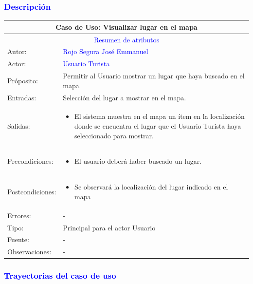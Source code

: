 \subsubsection{\textcolor{blue}{Descripción}}
\begin{tabularx}{16cm}{||l|X||}
	\hline
	\multicolumn{2}{||c||}{Caso de Uso: Visualizar lugar en el mapa } \\
	\hline
	\multicolumn{2}{||c||}{\textcolor{blue}{Resumen de atributos}} \\
         \hline
	{Autor:} & {\textcolor{blue}{Rojo Segura José Emmanuel}} \\
	\hline
	\hline
	{Actor:} & {\textcolor{blue}{Usuario Turista}} \\
	\hline
	{Próposito:} & {Permitir al Usuario mostrar un lugar que haya buscado en el mapa} \\
	\hline
	{Entradas:} &  Selección del lugar a mostrar en el mapa.\\
	\hline
	{Salidas:} & 
        \begin{itemize}
        \item El sistema muestra en el mapa un ítem en la localización donde se encuentra el lugar que el Usuario Turista haya seleccionado para mostrar.
        \end{itemize} \\
	\hline
	{Precondiciones:} & 
 \begin{itemize}
     \item El usuario deberá haber buscado un lugar.
 \end{itemize}\\ 
	\hline
	{Postcondiciones:} & 
         \begin{itemize}
            \item Se observará la localización del lugar indicado en el mapa
        \end{itemize}\\
	\hline
	{Errores:} & {-}\\ 
	\hline
	{Tipo:} & Principal para el actor Usuario\\
	\hline
	{Fuente:} & {-} \\
	\hline
	{Observaciones:} & {-} \\
	\hline
\end{tabularx}

\subsubsection{\textcolor{blue}{Trayectorias del caso de uso}}

